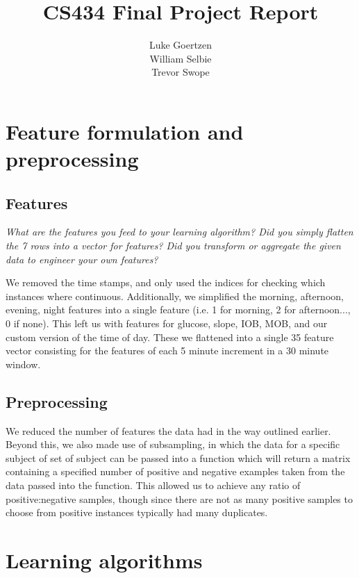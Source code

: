 \documentclass[11pt,a4paper]{article}
\title{CS434 Final Project Report}
\author{Luke Goertzen \\ William Selbie \\ Trevor Swope}
\date{}
\begin{document}
\maketitle

\section{Feature formulation and preprocessing}

\subsection{Features} 
\textit{What are the features you feed to your learning algorithm? Did you simply flatten the 7 rows into a vector for features? Did you transform or aggregate the given data to engineer your own features?}

We removed the time stamps, and only used the indices for checking which instances where continuous. Additionally, we simplified the morning, afternoon, evening, night features into a single feature (i.e. 1 for morning, 2 for afternoon..., 0 if none). This left us with features for  glucose, slope, IOB, MOB, and our custom version of the time of day. These we flattened into a single 35 feature vector consisting for the features of each 5 minute increment in a 30 minute window.


\subsection{Preprocessing}

We reduced the number of features the data had in the way outlined earlier. Beyond this, we also made use of subsampling, in which the data for a specific subject of set of subject can be passed into a function which will return a matrix containing a specified number of positive and negative examples taken from the data passed into the function. This allowed us to achieve any ratio of positive:negative samples, though since there are not as many positive samples to choose from positive instances typically had many duplicates.

\section{Learning algorithms}
\end{document}
